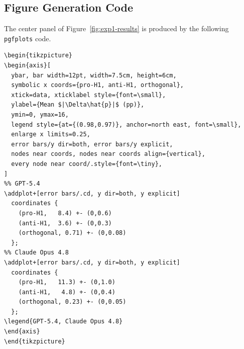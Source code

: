 
\subsection{Figure Generation Code}
\label{app:fig-code}

The center panel of Figure~\ref{fig:exp1-results} is produced by the following
\texttt{pgfplots} code.

\begin{verbatim}
\begin{tikzpicture}
\begin{axis}[
  ybar, bar width=12pt, width=7.5cm, height=6cm,
  symbolic x coords={pro-H1, anti-H1, orthogonal},
  xtick=data, xticklabel style={font=\small},
  ylabel={Mean $|\Delta\hat{p}|$ (pp)},
  ymin=0, ymax=16,
  legend style={at={(0.98,0.97)}, anchor=north east, font=\small},
  enlarge x limits=0.25,
  error bars/y dir=both, error bars/y explicit,
  nodes near coords, nodes near coords align={vertical},
  every node near coord/.style={font=\tiny},
]
%% GPT-5.4
\addplot+[error bars/.cd, y dir=both, y explicit]
  coordinates {
    (pro-H1,   8.4) +- (0,0.6)
    (anti-H1,  3.6) +- (0,0.3)
    (orthogonal, 0.71) +- (0,0.08)
  };
%% Claude Opus 4.8
\addplot+[error bars/.cd, y dir=both, y explicit]
  coordinates {
    (pro-H1,   11.3) +- (0,1.0)
    (anti-H1,   4.8) +- (0,0.4)
    (orthogonal, 0.23) +- (0,0.05)
  };
\legend{GPT-5.4, Claude Opus 4.8}
\end{axis}
\end{tikzpicture}
\end{verbatim}
